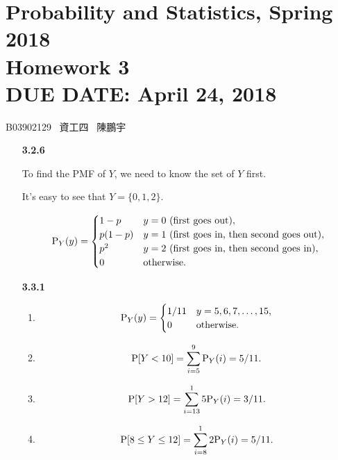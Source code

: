 \documentclass{article}
\newcommand{\hmwkClass}{Probability and Statistics, Spring 2018}
\newcommand{\hmwkTitle}{Homework 3}
\newcommand{\hmwkDueDate}{April 24, 2018}
\begin{document}
\thispagestyle{empty}
\section*{\hmwkClass \\
    \normalsize{\hmwkTitle} \\
    \normalsize{DUE DATE: \hmwkDueDate}
}

\hfill{B03902129 \, 資工四 \, 陳鵬宇}

\begin{enumerate}
    \item [\textbf{3.2.6}]

    To find the PMF of $Y$, we need to know the set of $Y$ first.

    It's easy to see that $Y = \{0, 1, 2\}$.

    $$
    \text P_Y(y) =
    \begin{cases}
        1 - p    & y = 0 \text{ (first goes out)}, \\
        p(1 - p) & y = 1 \text{ (first goes in, then second goes out)}, \\
        p^2      & y = 2 \text{ (first goes in, then second goes in)}, \\
        0        & \text{otherwise}.
    \end{cases}
    $$

    \item [\textbf{3.3.1}]

    \begin{enumerate}[label=(\alph*)]
        \item
        
        $$
        \text P_Y(y) =
        \begin{cases}
            1 / 11 & y = 5, 6, 7, \dots, 15, \\
            0      & \text{otherwise}.
        \end{cases}
        $$

        \item

        $$\text P[Y < 10] = \sum_{i = 5}^9 \text P_Y(i) = 5 / 11.$$

        \item 

        $$\text P[Y > 12] = \sum_{i = 13}^15 \text P_Y(i) = 3 / 11.$$

        \item

        $$\text P[8 \le Y \le 12] = \sum_{i = 8}^12 \text P_Y(i) = 5 / 11.$$


\end{enumerate}
\end{enumerate}
\end{document}
